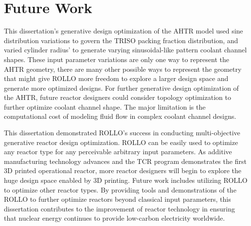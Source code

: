 

\section{Future Work}
This dissertation's generative design optimization of the \gls{AHTR} model used sine 
distribution variations to govern the \gls{TRISO} packing fraction distribution, and  
varied cylinder radius' to generate varying sinusoidal-like pattern coolant channel 
shapes. 
These input parameter variations are only one way to represent the \gls{AHTR} 
geometry, there are many other possible ways to represent the geometry that might 
give \gls{ROLLO} more freedom to explore a larger design space and generate more 
optimized designs. 
For further generative design optimization of the \gls{AHTR}, future reactor designers 
could consider topology optimization to further optimize coolant channel shape. 
The major limitation is the computational cost of modeling fluid flow in complex 
coolant channel designs. 

This dissertation demonstrated \gls{ROLLO}'s success in conducting multi-objective 
generative reactor design optimization. 
\gls{ROLLO} can be easily used to optimize any reactor type for any perceivable 
arbitrary input parameters. 
As additive manufacturing technology advances and the \gls{TCR} program 
demonstrates the first 3D printed operational reactor, more reactor designers 
will begin to explore the huge design space enabled by 3D printing. 
Future work includes utilizing \gls{ROLLO} to optimize other reactor types. 
By providing tools and demonstrations of the \gls{ROLLO} to further optimize reactors 
beyond classical input parameters, this dissertation contributes to the improvement of 
reactor technology in ensuring that nuclear energy continues to provide 
low-carbon electricity worldwide.






